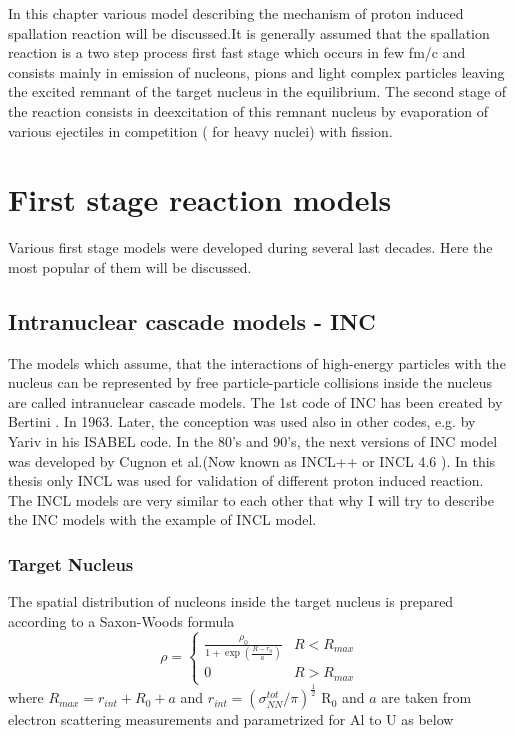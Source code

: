 In this chapter various model describing the mechanism of proton induced spallation reaction will be discussed.It is generally assumed that the spallation reaction is a two step process first fast stage which occurs in few fm/c and consists mainly in emission of nucleons, pions  and light complex particles leaving the excited remnant of the target nucleus in the equilibrium.  The second stage of the reaction consists in deexcitation of this remnant nucleus by evaporation of various ejectiles in competition ( for heavy nuclei) with fission.
\section{First stage reaction models}
Various first stage models were developed during several last decades.  Here the most popular of them will be discussed. 
\subsection{Intranuclear cascade models - INC}
The models which assume, that the interactions of high-energy particles with the nucleus can be represented by free particle-particle collisions inside the nucleus are called intranuclear cascade models. The 1st code of INC has been created by Bertini . In 1963. Later, the conception was used also in other codes, e.g. by Yariv in his ISABEL code. 
In the 80's and 90's, the next versions of INC model was developed by Cugnon et al.(Now known as INCL++ or INCL 4.6 ).
In this thesis only INCL was used for validation of different proton induced reaction. The INCL models are very similar to each other that why I will try to describe the INC models with the example of INCL model.
\subsubsection{Target Nucleus}
The spatial distribution of nucleons inside the target nucleus is prepared according to a Saxon-Woods formula\\
\begin{equation}\label{key}
\rho= \begin{cases} \frac{\rho_{0}}{1+\exp(\frac{R-r_{0}}{a})} &  R<R_{max}\\ 
0 &  R> R_{max} \end{cases} 
\end{equation}
where $R_{max}=r_{int} + R_{0} + a$ and $r_{int}=(\sigma_{NN}^{tot}/\pi)^\frac{1}{2}$
R$_{0}$ and $a$ are taken from electron scattering measurements and parametrized for Al to U as below

